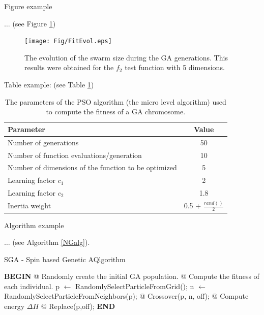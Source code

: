 \documentclass[runningheads,a4paper,11pt]{report}
\begin{document}
Figure example 

$\ldots$ (see Figure \ref{swarmsize})

\begin{figure}[htbp]
	\centerline{\texttt{[image: Fig/FitEvol.eps]}}  
	\caption{The evolution of the swarm size during the GA generations. This results were obtained for the $f_2$ test function with 5 dimensions.}
	\label{swarmsize}
\end{figure}


Table example: (see Table \ref{tab3PSO})


\begin{table}[htbp]
	\caption{The parameters of the PSO algorithm (the micro level algorithm) used to compute the fitness of a GA chromosome.}
	\label{tab3PSO}
		\begin{center}
			\begin{tabular}{p{220pt}c}

				\textbf{Parameter}& \textbf{Value} \\
				\hline\hline
 				Number of generations& 50 \\
 				Number of function evaluations/generation& 10 \\
 				Number of dimensions of the function to be optimized& 5 \\
 				Learning factor $c_{1}$& 2 \\
 				Learning factor $c_{2}$ & 1.8\\
 				Inertia weight& 0.5 + $\frac{rand()}{2}$\\
		
			\end{tabular}
		\end{center}
\end{table}

Algorithm example 

$\ldots$ (see Algorithm \ref{NGalg}).



\begin{algorithm}
	\caption{SGA - Spin based Genetic AQlgorithm}
	\label{NGalg}
		\begin{algorithmic}


			\STATE \textbf{BEGIN}
  		\STATE @ Randomly create the initial GA population.
  		\STATE @ Compute the fitness of each individual.
  				\STATE p $\leftarrow$ RandomlySelectParticleFromGrid();
  				\STATE n $\leftarrow$ RandomlySelectParticleFromNeighbors(p);
  				\STATE @ Crossover(p, n, off);
  				\STATE @ Compute energy $\Delta H$
  					\STATE @ Replace(p,off);
  				\ENDIF
  			\ENDFOR
  		\ENDFOR
  		\STATE \textbf{END}
\end{algorithmic}
\end{algorithm}




\end{document}
